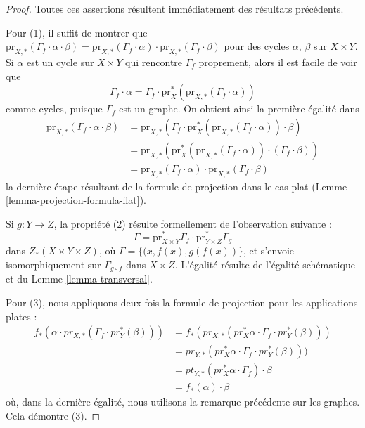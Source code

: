 \begin{proof}
Toutes ces assertions résultent immédiatement des résultats précédents.

\medskip\noindent
Pour (1), il suffit de montrer que
$\text{pr}_{X,*}( \Gamma_f \cdot \alpha \cdot \beta) =
\text{pr}_{X,*}(\Gamma_f \cdot \alpha) \cdot
\text{pr}_{X,*}(\Gamma_f \cdot \beta)$
pour des cycles $\alpha$, $\beta$ sur $X \times Y$. Si $\alpha$ est un cycle sur
$X \times Y$ qui rencontre $\Gamma_f$ proprement, alors il est facile
de voir que
$$
\Gamma_f \cdot \alpha =
\Gamma_f \cdot \text{pr}_X^*(\text{pr}_{X,*}(\Gamma_f \cdot \alpha))
$$
comme cycles, puisque $\Gamma_f$ est un graphe. On obtient ainsi la première
égalité dans
\begin{align*}
\text{pr}_{X,*}(\Gamma_f \cdot \alpha \cdot \beta)
& =
\text{pr}_{X,*}(
\Gamma_f \cdot
\text{pr}_X^*(\text{pr}_{X,*}(\Gamma_f \cdot \alpha)) \cdot \beta) \\
& =
\text{pr}_{X,*}(\text{pr}_X^*(\text{pr}_{X,*}(\Gamma_f \cdot \alpha))
\cdot (\Gamma_f \cdot \beta)) \\
& =
\text{pr}_{X,*}(\Gamma_f \cdot \alpha) \cdot
\text{pr}_{X,*}(\Gamma_f \cdot \beta)
\end{align*}
la dernière étape résultant de la formule de projection dans le cas plat
(Lemme \ref{lemma-projection-formula-flat}).

\medskip\noindent
Si $g : Y \to Z$, la propriété (2) résulte formellement de l'observation suivante :
$$
\Gamma =
\text{pr}_{X \times Y}^*\Gamma_f \cdot
\text{pr}_{Y \times Z}^*\Gamma_g
$$
dans $Z_*(X \times Y \times Z)$, où $\Gamma = \{(x, f(x), g(f(x))\}$,
et s'envoie isomorphiquement sur $\Gamma_{g \circ f}$ dans $X \times Z$.
L'égalité résulte de l'égalité schématique et du
Lemme \ref{lemma-transversal}.

\medskip\noindent
Pour (3), nous appliquons deux fois la formule de projection pour les applications plates :
\begin{align*}
f_*(\alpha \cdot pr_{X, *}(\Gamma_f \cdot pr_Y^*(\beta)))
& =
f_*(pr_{X, *}(pr_X^*\alpha \cdot \Gamma_f \cdot pr_Y^*(\beta))) \\
& =
pr_{Y, *}(pr_X^*\alpha \cdot \Gamma_f \cdot pr_Y^*(\beta))) \\
& =
pt_{Y, *}(pr_X^*\alpha \cdot \Gamma_f) \cdot \beta \\
& =
f_*(\alpha) \cdot \beta
\end{align*}
où, dans la dernière égalité, nous utilisons la remarque précédente sur les graphes.
Cela démontre (3).


\end{proof}
